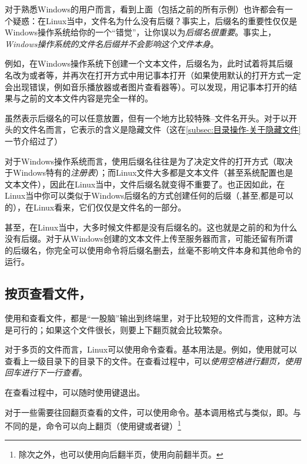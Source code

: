 对于熟悉Windows的用户而言，看到上面（包括之前的所有示例）也许都会有一个疑惑：在Linux当中，文件名为什么没有后缀？事实上，后缀名的重要性仅仅是Windows操作系统给你的一个“错觉”，让你误以为\emph{后缀名很重要}。事实上，\emph{Windows操作系统的文件名后缀并不会影响这个文件本身}。

例如，在Windows操作系统下创建一个文本文件，后缀名为，此时试着将其后缀名改为或者等，并再次在打开方式中用记事本打开（如果使用默认的打开方式一定会出现错误，例如音乐播放器或者图片查看器等）。可以发现，用记事本打开的结果与之前的文本文件内容是完全一样的。

\begin{attention}
    虽然表示后缀名的可以任意放置，但有一个地方比较特殊--文件名开头。对于以开头的文件名而言，它表示的含义是隐藏文件（这在\ref{subsec:目录操作-关于隐藏文件}一节介绍过了）
\end{attention}

对于Windows操作系统而言，使用后缀名往往是为了决定文件的打开方式（取决于Windows特有的\emph{注册表}）；而Linux文件大多都是文本文件（甚至系统配置也是文本文件），因此在Linux当中，文件后缀名就变得不重要了。也正因如此，在Linux当中你可以类似于Windows后缀名的方式创建任何的后缀（,甚至,都是可以的），在Linux看来，它们仅仅是文件名的一部分。

甚至，在Linux当中，大多时候文件都是没有后缀名的。这也就是之前的和为什么没有后缀。对于从Windows创建的文本文件上传至服务器而言，可能还留有所谓的后缀名，你完全可以使用命令将后缀名删去，丝毫不影响文件本身和其他命令的运行。

\subsection{按页查看文件，}\label{subsec:查看文件-按页查看文件}

使用和查看文件，都是“一股脑”输出到终端里，对于比较短的文件而言，这种方法是可行的；如果这个文件很长，则要上下翻页就会比较繁杂。

对于多页的文件而言，Linux可以使用命令查看。基本用法是。例如，使用就可以查看上一级目录下的目录下的文件。在查看过程中，可以\emph{使用空格进行翻页，使用回车进行下一行查看}。

在查看过程中，可以随时使用键退出。

对于一些需要往回翻页查看的文件，可以使用命令。基本调用格式与类似，即。与不同的是，命令可以向上翻页（使用键或者键）\footnote{除次之外，也可以使用向后翻半页，使用向前翻半页。}

